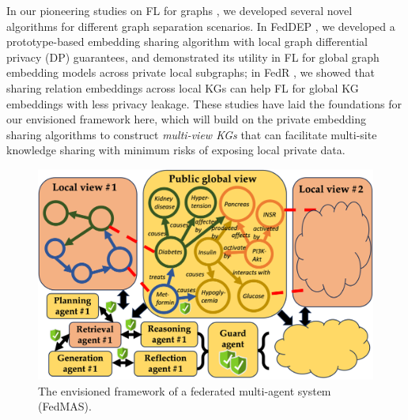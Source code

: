 In our pioneering studies on FL for graphs \cite{he2021fedgraphnn, xie2021federated, zhang2021subgraph, zhang2024deep, xie2023federated, zhang2022efficient, gu2023dynamic, xie2024federated}, we developed several novel algorithms for different graph separation scenarios. In FedDEP \cite{zhang2024deep}, we developed a prototype-based embedding sharing algorithm with local graph differential privacy (DP) guarantees, and demonstrated its utility in FL for global graph embedding models across private local subgraphs; in FedR \cite{zhang2022efficient}, we showed that sharing relation embeddings across local KGs can help FL for global KG embeddings with less privacy leakage. These studies have laid the foundations for our envisioned framework here, which will build on the private embedding sharing algorithms to construct \textit{multi-view KGs} that can facilitate multi-site knowledge sharing with minimum risks of exposing local private data.

\begin{figure}[htbp]
    \begin{center}
    \includegraphics[width=.75\columnwidth]{submissions/CarlYang2024/figures/fedmas.png}
    \end{center}
    \caption{The envisioned framework of a federated multi-agent system (FedMAS).}
    \label{fig:fedmas}
\end{figure}

